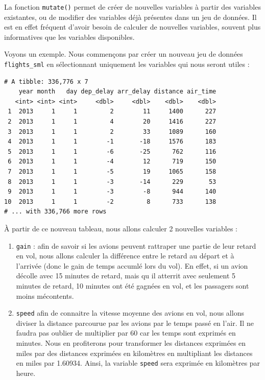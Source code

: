 \documentclass[a4paperpaper,]{article}
\newenvironment{Shaded}{\begin{snugshade}}{\end{snugshade}}
\newcommand{\KeywordTok}[1]{\textcolor[rgb]{0.12,0.11,0.11}{\textbf{#1}}}
\newcommand{\NormalTok}[1]{\textcolor[rgb]{0.12,0.11,0.11}{#1}}
\newcommand{\OperatorTok}[1]{\textcolor[rgb]{0.12,0.11,0.11}{#1}}
\newcommand{\StringTok}[1]{\textcolor[rgb]{0.75,0.01,0.01}{#1}}
\providecommand{\tightlist}{%
  \setlength{\itemsep}{0pt}\setlength{\parskip}{0pt}}
\begin{document}
La fonction \texttt{mutate()} permet de créer de nouvelles variables à partir des variables existantes, ou de modifier des variables déjà présentes dans un jeu de données. Il est en effet fréquent d'avoir besoin de calculer de nouvelles variables, souvent plus informatives que les variables disponibles.

Voyons un exemple. Nous commençons par créer un nouveau jeu de données \texttt{flights\_sml} en sélectionnant uniquement les variables qui nous seront utiles :

\begin{Shaded}
\end{Shaded}

\begin{verbatim}
# A tibble: 336,776 x 7
    year month   day dep_delay arr_delay distance air_time
   <int> <int> <int>     <dbl>     <dbl>    <dbl>    <dbl>
 1  2013     1     1         2        11     1400      227
 2  2013     1     1         4        20     1416      227
 3  2013     1     1         2        33     1089      160
 4  2013     1     1        -1       -18     1576      183
 5  2013     1     1        -6       -25      762      116
 6  2013     1     1        -4        12      719      150
 7  2013     1     1        -5        19     1065      158
 8  2013     1     1        -3       -14      229       53
 9  2013     1     1        -3        -8      944      140
10  2013     1     1        -2         8      733      138
# ... with 336,766 more rows
\end{verbatim}

À partir de ce nouveau tableau, nous allons calculer 2 nouvelles variables :

\begin{enumerate}
\def\labelenumi{\arabic{enumi}.}
\tightlist
\item
  \texttt{gain} : afin de savoir si les avions peuvent rattraper une partie de leur retard en vol, nous allons calculer la différence entre le retard au départ et à l'arrivée (donc le gain de temps accumlé lors du vol). En effet, si un avion décolle avec 15 minutes de retard, mais qu
  il atterrit avec seulement 5 minutes de retard, 10 minutes ont été gagnées en vol, et les passagers sont moins mécontents.
\item
  \texttt{speed} afin de connaitre la vitesse moyenne des avions en vol, nous allons diviser la distance parcourue par les avions par le temps passé en l'air. Il ne faudra pas oublier de multiplier par 60 car les temps sont exprimés en minutes. Nous en profiterons pour transformer les distances exprimées en miles par des distances exprimées en kilomètres en multipliant les distances en miles par 1.60934. Ainsi, la variable \texttt{speed} sera exprimée en kilomètres par heure.
\end{enumerate}
\end{document}

